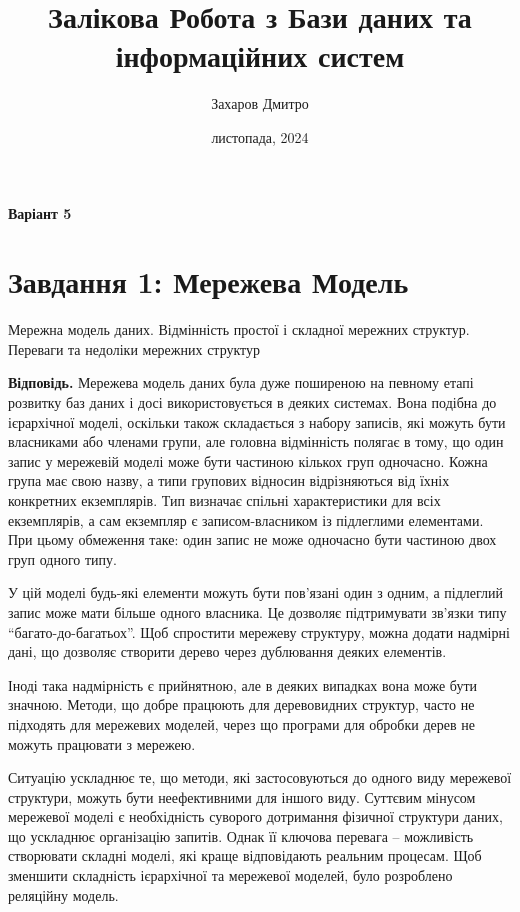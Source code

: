 \documentclass{hw_template}
\title{\huge\sffamily\bfseries Залікова Робота з Бази даних та інформаційних систем}
\author{\Large\sffamily Захаров Дмитро}
\date{\sffamily 28 листопада, 2024}
\begin{document}
\pagestyle{fancy}

\maketitle

\begin{center}
    \textbf{Варіант 5}
\end{center}

\tableofcontents

\pagebreak

\section{Завдання 1: Мережева Модель}

\begin{problem}
    Мережна модель даних. Відмінність простої і складної мережних структур. Переваги
та недоліки мережних структур
\end{problem}

\textbf{Відповідь.} Мережева модель даних була дуже поширеною на певному етапі
розвитку баз даних і досі використовується в деяких системах. Вона подібна до
ієрархічної моделі, оскільки також складається з набору записів, які можуть бути
власниками або членами групи, але головна відмінність полягає в тому, що один
запис у мережевій моделі може бути частиною кількох груп одночасно. Кожна група
має свою назву, а типи групових відносин відрізняються від їхніх конкретних
екземплярів. Тип визначає спільні характеристики для всіх екземплярів, а сам
екземпляр є записом-власником із підлеглими елементами. При цьому обмеження
таке: один запис не може одночасно бути частиною двох груп одного типу.

У цій моделі будь-які елементи можуть бути пов’язані один з одним, а підлеглий
запис може мати більше одного власника. Це дозволяє підтримувати зв’язки типу
``багато-до-багатьох''. Щоб спростити мережеву структуру, можна додати надмірні
дані, що дозволяє створити дерево через дублювання деяких елементів.

Іноді така надмірність є прийнятною, але в деяких випадках вона може бути
значною. Методи, що добре працюють для деревовидних структур, часто не підходять
для мережевих моделей, через що програми для обробки дерев не можуть працювати з
мережею.

Ситуацію ускладнює те, що методи, які застосовуються до одного виду мережевої
структури, можуть бути неефективними для іншого виду. Суттєвим мінусом мережевої
моделі є необхідність суворого дотримання фізичної структури даних, що ускладнює
організацію запитів. Однак її ключова перевага -- можливість створювати складні
моделі, які краще відповідають реальним процесам. Щоб зменшити складність
ієрархічної та мережевої моделей, було розроблено реляційну модель.
\end{document}
